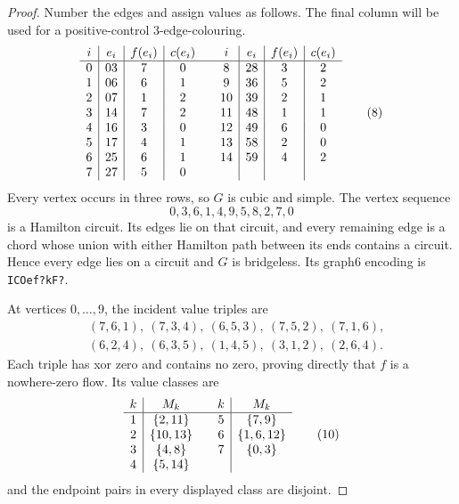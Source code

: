 \documentclass[11pt]{article}
\theoremstyle{definition}
\theoremstyle{remark}
\begin{document}
\begin{proof}
Number the edges and assign values as follows.  The final column will be
used for a positive-control 3-edge-colouring.
\[
\begin{array}{c|c|c|c@{\qquad}c|c|c|c}
i&e_i&f(e_i)&c(e_i)&i&e_i&f(e_i)&c(e_i)\\ \hline
0&03&7&0& 8&28&3&2\\
1&06&6&1& 9&36&5&2\\
2&07&1&2&10&39&2&1\\
3&14&7&2&11&48&1&1\\
4&16&3&0&12&49&6&0\\
5&17&4&1&13&58&2&0\\
6&25&6&1&14&59&4&2\\
7&27&5&0&&&&
\end{array}                                                       \tag{8}
\]
Every vertex occurs in three rows, so \(G\) is cubic and simple.  The
vertex sequence
\[
 0,3,6,1,4,9,5,8,2,7,0
\]
is a Hamilton circuit.  Its edges lie on that circuit, and every remaining
edge is a chord whose union with either Hamilton path between its ends
contains a circuit.  Hence every edge lies on a circuit and \(G\) is
bridgeless.  Its graph6 encoding is \texttt{ICOef?kF?}.

At vertices \(0,\ldots,9\), the incident value triples are
\[
\begin{split}
 &(7,6,1),\ (7,3,4),\ (6,5,3),\ (7,5,2),\ (7,1,6),\\
 &(6,2,4),\ (6,3,5),\ (1,4,5),\ (3,1,2),\ (2,6,4).
\end{split}                                                       \tag{9}
\]
Each triple has xor zero and contains no zero, proving directly that
\(f\) is a nowhere-zero flow.  Its value classes are
\[
\begin{array}{c|c@{\qquad}c|c}
k&M_k&k&M_k\\ \hline
1&\{2,11\}&5&\{7,9\}\\
2&\{10,13\}&6&\{1,6,12\}\\
3&\{4,8\}&7&\{0,3\}\\
4&\{5,14\}&&
\end{array}                                                       \tag{10}
\]
and the endpoint pairs in every displayed class are disjoint.


\end{proof}
\end{document}
